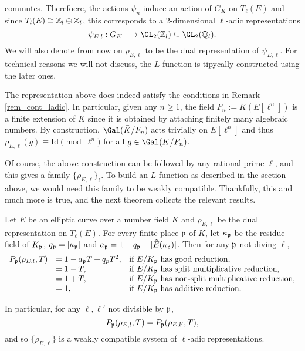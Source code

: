 commutes. Therefoere, the actions $\psi_n$ induce an action of $G_K$ on $T_\ell(E)$ and since $T_l(E)\cong\mathbb{Z}_l\oplus\mathbb{Z}_l$, this corresponds to a $2$-dimensional $\ell$-adic representations
$$\psi_{E,\ell}:G_K\longrightarrow \GL_2(\ZZ_\ell)\subseteq\GL_2(\QQ_\ell).$$
We will also denote from now on $\rho_{E,\ell}$ to be the dual representation of $\psi_{E,\ell}$. For technical reasons we will not discuss, the $L$-function is tipycally constructed using the later ones.

\begin{rem}
    The representation above does indeed satisfy the conditions in Remark \ref{rem_cont_ladic}. In particular, given any $n\geq 1$, the field $F_n:=K(E[\ell^n])$ is a finite extension of $K$ since it is obtained by attaching finitely many algebraic numbers. By construction, $\Gal(\bar{K}/F_n)$ acts trivially on $E[\ell^n]$ and thus $\rho_{E,\ell}(g)\equiv \mathrm{Id}\pmod{\ell^n}$ for all $g\in\Gal(\bar{K}/F_n)$.
\end{rem}

Of course, the above construction can be followed by any rational prime $\ell$, and this gives a family $\{\rho_{E,\ell}\}_\ell$. To build an $L$-function as described in the section above, we would need this family to be weakly compatible. Thankfully, this and much more is true, and the next theorem collects the relevant results.

\begin{thm}
    Let $E$ be an elliptic curve over a number field $K$ and $\rho_{E,\ell}$ be the dual representation on $T_\ell(E)$. For every finite place $\mathfrak{p}$ of $K$, let $\kappa_{\mathfrak{p}}$ be the residue field of $K_{\mathfrak{p}}$, $q_{\mathfrak{p}}=|\kappa_{\mathfrak{p}}|$ and $a_{\mathfrak{p}}=1+q_{\mathfrak{p}}-|\tilde{E}(\kappa_{\mathfrak{p}})|$. Then for any $\mathfrak{p}$ not diving $\ell$,
    \[
        \begin{array}{l l l}
            P_{\mathfrak{p}}(\rho_{E,l},T)&= 1-a_{\mathfrak{p}} T+q_p T^2, & \text{if } E/K_{\mathfrak{p}} \text{ has good reduction,}\\
            & = 1-T, & \text{if } E/K_{\mathfrak{p}} \text{ has split multiplicative reduction,}\\
            & = 1+T, & \text{if } E/K_{\mathfrak{p}} \text{ has non-split multiplicative reduction,}\\
            & = 1, & \text{if } E/K_{\mathfrak{p}} \text{ has additive reduction.}
        \end{array}
    \]
    

    In particular, for any $\ell,\ell'$ not divisible by $\mathfrak{p}$, 
    $$P_{\mathfrak{p}}(\rho_{E,l},T)=P_{\mathfrak{p}}(\rho_{E,l'},T),$$
    and so $\{\rho_{E,\ell}\}$ is a weakly compatible system of $\ell$-adic representations.
\end{thm}

